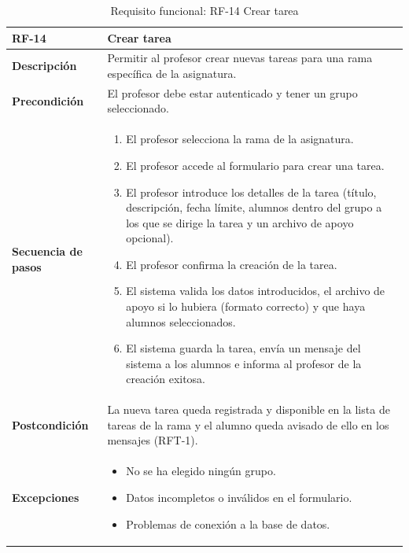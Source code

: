 \begin{table}[H]
\centering
\begin{tabularx}{\textwidth}{
  |>{\centering\arraybackslash}l
  |>{\centering\arraybackslash}X|}
\hline
\textbf{RF-14} & \textbf{Crear tarea} \\ \hline

\textbf{Descripción} & Permitir al profesor crear nuevas tareas para una rama específica de la asignatura. \\ \hline

\textbf{Precondición} & El profesor debe estar autenticado y tener un grupo seleccionado. \\ \hline

\textbf{Secuencia de pasos} & 
\begin{enumerate}
  \item El profesor selecciona la rama de la asignatura.
  \item El profesor accede al formulario para crear una tarea.
  \item El profesor introduce los detalles de la tarea (título, descripción, fecha límite, alumnos dentro del grupo a los que se dirige la tarea y un archivo de apoyo opcional).
  \item El profesor confirma la creación de la tarea.
  \item El sistema valida los datos introducidos, el archivo de apoyo si lo hubiera (formato correcto) y que haya alumnos seleccionados.
  \item El sistema guarda la tarea, envía un mensaje del sistema a los alumnos e informa al profesor de la creación exitosa.
\end{enumerate} \\ \hline

\textbf{Postcondición} & La nueva tarea queda registrada y disponible en la lista de tareas de la rama y el alumno queda avisado de ello en los mensajes (RFT-1). \\ \hline

\textbf{Excepciones} & 
\begin{itemize}
  \item No se ha elegido ningún grupo.
  \item Datos incompletos o inválidos en el formulario.
  \item Problemas de conexión a la base de datos.
\end{itemize} \\ \hline
\end{tabularx}
\caption{Requisito funcional: RF-14 Crear tarea}
\label{tab:RF-14}
\end{table}


